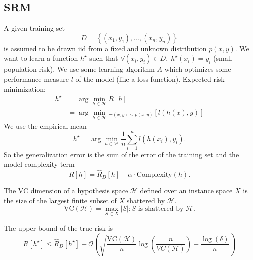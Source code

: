 \documentclass[a4paper,9pt]{extarticle}
\begin{document}
\begin{multicols*}{2}
\section{SRM}
A given training set 
\begin{equation*}
	D=\left\{(x_{1},y_{1}),\ldots,(x_{n},y_{n})\right\}
\end{equation*}
is assumed to be drawn iid from a fixed and unknown distribution $p(x,y)$. We want to learn a function $h^{\star}$ such that $\forall(x_{i},y_{i})\in D,\;h^{\star}(x_{i})=y_{i}$ (small population risk). We use some learning algorithm $A$ which optimizes some performance measure $l$ of the model (like a loss function). Expected risk minimization:
\begin{align*}
	h^{\star}&=\arg\min_{h\in\mathcal{H}}R[h]\\
	&=\arg\min_{h\in\mathcal{H}}\mathbb{E}_{(x,y)\sim p(x,y)}\left[l(h(x),y)\right]
\end{align*}
We use the empirical mean
\begin{equation*}
	h^{\star}=\arg\min_{h\in\mathcal{H}}\frac{1}{n}\sum_{i=1}^{n}l(h(x_{i}),y_{i}).
\end{equation*}
So the generalization error is the sum of the error of the training set and the model complexity term
\begin{equation*}
	R[h]=\hat{R}_{D}[h]+\alpha\cdot\text{Complexity}(h).
\end{equation*}
\begin{riquadro}[VC dimension]
	The VC dimension of a hypothesis space $\mathcal{H}$ defined over an instance space $X$ is the size of the largest finite subset of $X$ shattered by $\mathcal{H}$.
	\begin{equation*}
		\mathrm{VC}(\mathcal{H})=\max_{S\subset X}|S|:S\text{ is shattered by }\mathcal{H}.
	\end{equation*}
\end{riquadro}
The upper bound of the true risk is
\begin{equation*}
	R[h^{\star}]\leq\hat{R}_{D}[h^{\star}]+\mathcal{O}\left(\sqrt{\frac{\mathrm{VC}(\mathcal{H})}{n}\log\left(\frac{n}{VC(\mathcal{H})}\right)-\frac{\log(\delta)}{n}}\right)
\end{equation*}

\end{multicols*}
\end{document}
